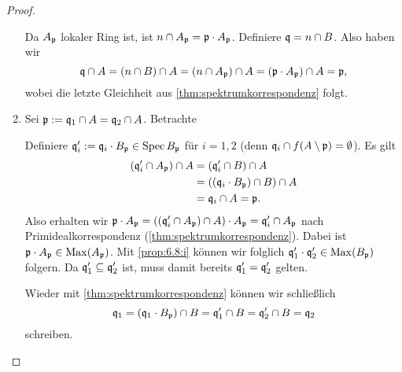 \documentclass[12pt,a4paper]{scrartcl}
\theoremstyle{cplain}
\theoremstyle{cdef}
\begin{document}
\begin{proof}
\begin{enumerate}[label=\ref{prop:6.8:\roman*}]
		Da $A_{\mathfrak{p}}$ lokaler Ring ist, ist $n\cap A_{\mathfrak{p}} = \mathfrak{p}\cdot A_{\mathfrak{p}}$. Definiere $\mathfrak{q} = n\cap B$. Also haben wir 
		\[\mathfrak{q}\cap A = (n\cap B)\cap A = (n\cap A_{\mathfrak{p}})\cap A = (\mathfrak{p}\cdot A_{\mathfrak{p}})\cap A = \mathfrak{p},\]
		wobei die letzte Gleichheit aus \cref{thm:spektrumkorrespondenz} folgt.
		\item Sei $\mathfrak{p} := \mathfrak{q}_1\cap A = \mathfrak{q}_2\cap A$. Betrachte
		\begin{center}
		\end{center}
		Definiere $\mathfrak{q}_i' := \mathfrak{q}_i\cdot B_{\mathfrak{p}}\in \operatorname{Spec} B_{\mathfrak{p}}$ für $i = 1,2$ (denn $\mathfrak{q}_i\cap f(A\setminus \mathfrak{p}) = \emptyset$). Es gilt \begin{align*}(\mathfrak{q}_i'\cap A_{\mathfrak{p}})\cap A &= (\mathfrak{q}_i'\cap B) \cap A \\
									   &= ((\mathfrak{q}_i\cdot B_{\mathfrak{p}})\cap B)\cap A\\
									   &= \mathfrak{q}_i \cap A = \mathfrak{p}.
		\end{align*}
		Also erhalten wir $\mathfrak{p}\cdot A_{\mathfrak{p}} = ((\mathfrak{q}_i'\cap A_{\mathfrak{p}})\cap A)\cdot A_{\mathfrak{p}} = \mathfrak{q}_i'\cap A_{\mathfrak{p}}$ nach Primidealkorrespondenz (\cref{thm:spektrumkorrespondenz}).
		Dabei ist $\mathfrak{p}\cdot A_{\mathfrak{p}}\in \operatorname{Max}(A_{\mathfrak{p}})$. Mit \ref{prop:6.8:i} können wir folglich $\mathfrak{q}_1'\cdot \mathfrak{q}_2'\in \operatorname{Max}(B_{\mathfrak{p}})$ folgern. Da $\mathfrak{q}_1'\subseteq \mathfrak{q}_2'$ ist, muss damit bereits $\mathfrak{q}_1' = \mathfrak{q}_2'$ gelten.
		
		Wieder mit \cref{thm:spektrumkorrespondenz} können wir schließlich
		\[\mathfrak{q}_1 = (\mathfrak{q}_1\cdot B_{\mathfrak{p}})\cap B = \mathfrak{q}_1'\cap B = \mathfrak{q}_2'\cap B = \mathfrak{q}_2\]
		schreiben.
		\qedhere
	\end{enumerate}
\end{proof}
\end{document}
